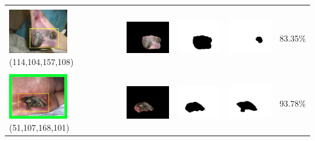 \begin{table}[H]
\begin{tabular}{|m{1.0in}|m{1.0in}|m{1.0in}|m{1.0in}|m{0.6in}|}
		&  &  & \\
		\includegraphics[width=1.0in]{gambar/hasil_segmentasi/luka_hitam/image_8_rect.jpg} {\centering\fontsize{10}{10}\selectfont(114,104,157,108)}&
		\includegraphics[width=1.0in]{gambar/hasil_segmentasi/luka_hitam/result_8.jpg}&
		\includegraphics[width=1.0in]{gambar/hasil_segmentasi/luka_hitam/mask_r_8.jpg}&
		\includegraphics[width=1.0in]{gambar/hasil_segmentasi/luka_hitam/8_r.jpg}&
		83.35\% \\
		\hline

		&  &  & \\
		\includegraphics[width=1.0in]{gambar/hasil_segmentasi/luka_hitam/image_20_rect.jpg} {\centering\fontsize{10}{10}\selectfont(51,107,168,101)}&
		\includegraphics[width=1.0in]{gambar/hasil_segmentasi/luka_hitam/result_20.jpg}&
		\includegraphics[width=1.0in]{gambar/hasil_segmentasi/luka_hitam/mask_r_20.jpg}&
		\includegraphics[width=1.0in]{gambar/hasil_segmentasi/luka_hitam/20_r.jpg}&
		93.78\% \\
		\hline
		

\end{tabular}
\end{table}
